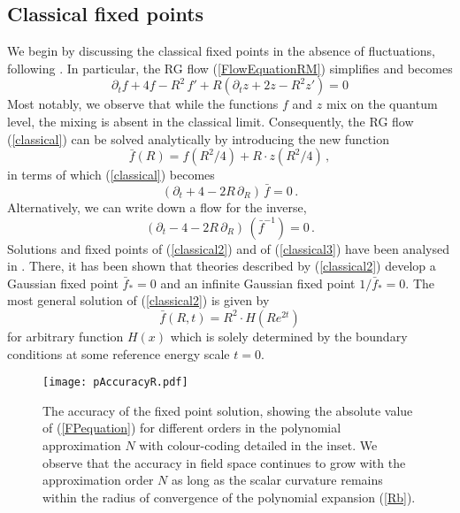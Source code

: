 \documentclass[notitlepage,eqsecnum,bm,amsmath,preprintnumbers,superscriptaddress,nofootinbib,aps,11pt]{revtex4-1}
\def\eq#1{(\ref{#1})}
\def\R{\rho}
\def\R{R}
\def\beq{\begin{equation}}
\def\eeq{\end{equation}}
\begin{document}
\subsection{Classical fixed points}
We begin by discussing the classical fixed points in the absence of fluctuations, following \cite{Falls:2014tra}. In particular, the RG flow \eq{FlowEquationRM} simplifies and becomes
\begin{equation}
\partial_t f+ 4 f-\R^2\,f'+\R\left(\partial_t z+2  z-\R^2  z' \right)=0 
\label{classical}
\end{equation}
Most notably, we observe that while the functions $f$ and $z$ mix on the quantum level, the mixing is absent  in the classical limit. Consequently, the RG flow \eq{classical} can be solved analytically by introducing the new function
\begin{equation}
\label{fbar}
\bar f(\R)= f({\R^2}/4)+\R\cdot z(\R^2/4)\,,
\end{equation}
in terms of which \eq{classical} becomes
\begin{equation}
\left(\partial_t+ 4 -2 \R\,\partial_\R\right)\,\bar f=0 \,.
\label{classical2}
\end{equation}
Alternatively, we can write down a flow for the inverse,
\begin{equation}
\left(\partial_t- 4 -2 \R\,\partial_\R\right)\,(\bar f^{-1})=0 \,.
\label{classical3}
\end{equation}
Solutions and fixed points of \eq{classical2} and of \eq{classical3} have been analysed in \cite{Falls:2014tra}. There, it has been shown that theories described by \eq{classical2}  develop a Gaussian fixed point $\bar f_*=0$ and an infinite Gaussian fixed point $1/\bar f_*=0$.
The most general solution of \eq{classical2} is given by
\beq\label{FPclassical}
\bar f(\R,t)=\R^2 \cdot H\left(\R e^{2t}\right)
\eeq
for arbitrary function $H(x)$ which is solely determined by the boundary conditions at some reference energy scale $t=0$. 



\begin{figure}[t]
\centering
\begin{center}
\texttt{[image: pAccuracyR.pdf]}
\caption{\label{pAcc} The accuracy of the fixed point solution, showing the absolute value of \eq{FPequation} for different orders in the polynomial approximation $N$ with colour-coding detailed in the inset. We observe that the accuracy in field space continues to grow with the approximation order $N$ as long as the scalar curvature remains within the radius of convergence of the polynomial expansion \eq{Rb}.}
\end{center}
\end{figure}
\end{document}
